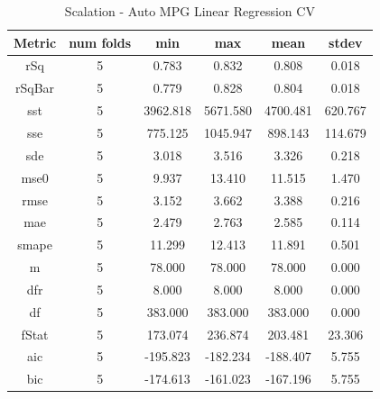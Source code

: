 \documentclass{article}
\begin{document}
\begin{table}[H]
\centering
\caption{Scalation - Auto MPG Linear Regression CV}
\label{tab:Scalation - Auto MPG Linear Regression CV}
\begin{tabular}{|c|c|c|c|c|c|}\hline
Metric & num folds & min & max & mean & stdev \\ \hline \hline
rSq & 5 & 0.783 & 0.832 & 0.808 & 0.018 \\ \hline
rSqBar & 5 & 0.779 & 0.828 & 0.804 & 0.018 \\ \hline
sst & 5 & 3962.818 & 5671.580 & 4700.481 & 620.767 \\ \hline
sse & 5 & 775.125 & 1045.947 & 898.143 & 114.679 \\ \hline
sde & 5 & 3.018 & 3.516 & 3.326 & 0.218 \\ \hline
mse0 & 5 & 9.937 & 13.410 & 11.515 & 1.470 \\ \hline
rmse & 5 & 3.152 & 3.662 & 3.388 & 0.216 \\ \hline
mae & 5 & 2.479 & 2.763 & 2.585 & 0.114 \\ \hline
smape & 5 & 11.299 & 12.413 & 11.891 & 0.501 \\ \hline
m & 5 & 78.000 & 78.000 & 78.000 & 0.000 \\ \hline
dfr & 5 & 8.000 & 8.000 & 8.000 & 0.000 \\ \hline
df & 5 & 383.000 & 383.000 & 383.000 & 0.000 \\ \hline
fStat & 5 & 173.074 & 236.874 & 203.481 & 23.306 \\ \hline
aic & 5 & -195.823 & -182.234 & -188.407 & 5.755 \\ \hline
bic & 5 & -174.613 & -161.023 & -167.196 & 5.755 \\ \hline
\end{tabular}
\end{table}
\end{document}
